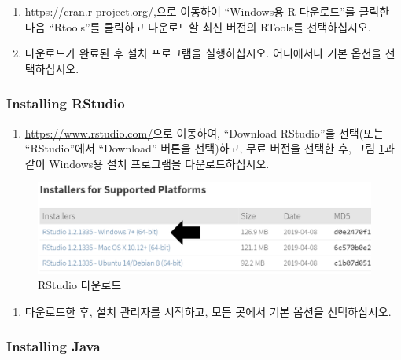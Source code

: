 \documentclass[11pt]{book}
\providecommand{\tightlist}{%
  \setlength{\itemsep}{0pt}\setlength{\parskip}{0pt}}
\theoremstyle{definition}
\theoremstyle{definition}
\theoremstyle{definition}
\theoremstyle{remark}
\begin{document}
\begin{enumerate}
\def\labelenumi{\arabic{enumi}.}
\item
  \url{https://cran.r-project.org/},으로 이동하여 ``Windows용 R
  다운로드''를 클릭한 다음 ``Rtools''를 클릭하고 다운로드할 최신 버전의
  RTools를 선택하십시오.
\item
  다운로드가 완료된 후 설치 프로그램을 실행하십시오. 어디에서나 기본
  옵션을 선택하십시오.
\end{enumerate}

\subsubsection*{Installing RStudio}\label{installing-rstudio}

\begin{enumerate}
\def\labelenumi{\arabic{enumi}.}
\tightlist
\item
  \url{https://www.rstudio.com/}으로 이동하여, ``Download RStudio''을
  선택(또는 ``RStudio''에서 ``Download'' 버튼을 선택)하고, 무료 버전을
  선택한 후, 그림 \ref{fig:downloadRStudio}과 같이 Windows용 설치
  프로그램을 다운로드하십시오.
\end{enumerate}

\begin{figure}

{\centering \includegraphics[width=1\linewidth]{images/OhdsiAnalyticsTools/downloadRStudio} 

}

\caption{RStudio 다운로드}\label{fig:downloadRStudio}
\end{figure}

\begin{enumerate}
\def\labelenumi{\arabic{enumi}.}
\setcounter{enumi}{1}
\tightlist
\item
  다운로드한 후, 설치 관리자를 시작하고, 모든 곳에서 기본 옵션을
  선택하십시오.
\end{enumerate}

\subsubsection*{Installing Java}\label{installing-java}
\end{document}
